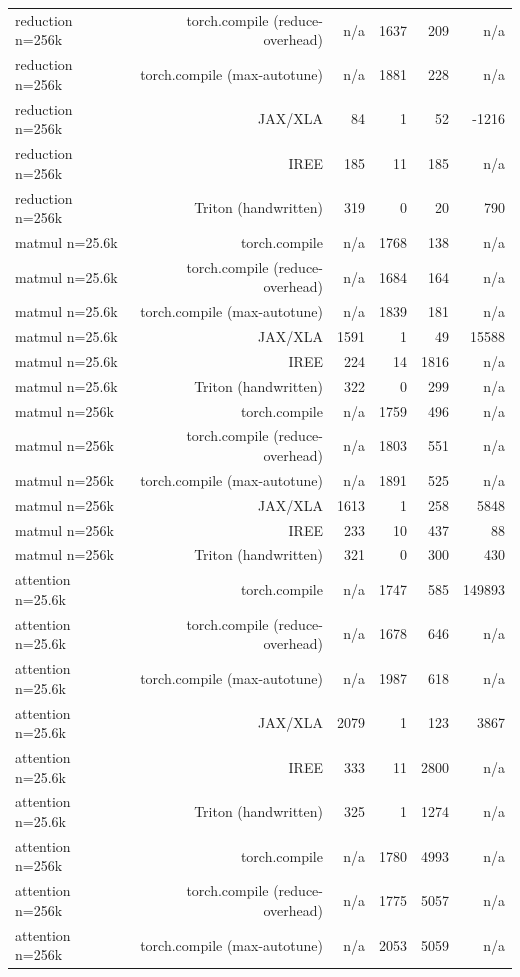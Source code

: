 \begin{tabular}{lrrrrr}
reduction n=256k & torch.compile (reduce-overhead) & n/a & 1637 & 209 & n/a \\
reduction n=256k & torch.compile (max-autotune) & n/a & 1881 & 228 & n/a \\
reduction n=256k & JAX/XLA & 84 & 1 & 52 & -1216 \\
reduction n=256k & IREE & 185 & 11 & 185 & n/a \\
reduction n=256k & Triton (handwritten) & 319 & 0 & 20 & 790 \\
matmul n=25.6k & torch.compile & n/a & 1768 & 138 & n/a \\
matmul n=25.6k & torch.compile (reduce-overhead) & n/a & 1684 & 164 & n/a \\
matmul n=25.6k & torch.compile (max-autotune) & n/a & 1839 & 181 & n/a \\
matmul n=25.6k & JAX/XLA & 1591 & 1 & 49 & 15588 \\
matmul n=25.6k & IREE & 224 & 14 & 1816 & n/a \\
matmul n=25.6k & Triton (handwritten) & 322 & 0 & 299 & n/a \\
matmul n=256k & torch.compile & n/a & 1759 & 496 & n/a \\
matmul n=256k & torch.compile (reduce-overhead) & n/a & 1803 & 551 & n/a \\
matmul n=256k & torch.compile (max-autotune) & n/a & 1891 & 525 & n/a \\
matmul n=256k & JAX/XLA & 1613 & 1 & 258 & 5848 \\
matmul n=256k & IREE & 233 & 10 & 437 & 88 \\
matmul n=256k & Triton (handwritten) & 321 & 0 & 300 & 430 \\
attention n=25.6k & torch.compile & n/a & 1747 & 585 & 149893 \\
attention n=25.6k & torch.compile (reduce-overhead) & n/a & 1678 & 646 & n/a \\
attention n=25.6k & torch.compile (max-autotune) & n/a & 1987 & 618 & n/a \\
attention n=25.6k & JAX/XLA & 2079 & 1 & 123 & 3867 \\
attention n=25.6k & IREE & 333 & 11 & 2800 & n/a \\
attention n=25.6k & Triton (handwritten) & 325 & 1 & 1274 & n/a \\
attention n=256k & torch.compile & n/a & 1780 & 4993 & n/a \\
attention n=256k & torch.compile (reduce-overhead) & n/a & 1775 & 5057 & n/a \\
attention n=256k & torch.compile (max-autotune) & n/a & 2053 & 5059 & n/a \\

\end{tabular}
